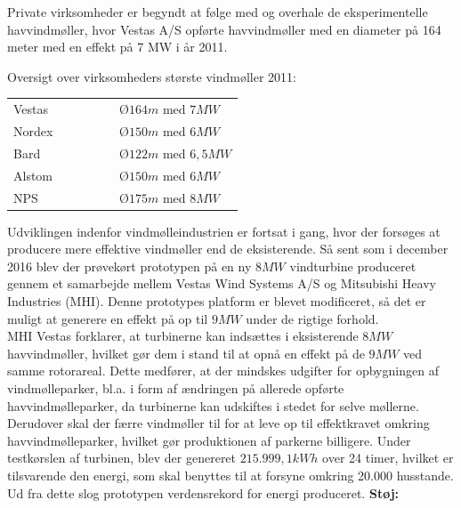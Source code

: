Private virksomheder er begyndt at følge med og overhale de eksperimentelle havvindmøller, hvor Vestas A/S opførte havvindmøller med en diameter på 164 meter med en effekt på 7 MW i år 2011.

Oversigt over virksomheders største vindmøller 2011: %
\begin{table}[H]
\centering
\begin{tabular}{l|l}
Vestas \ \ \ \ & \ \ \ \ $Ø164 m$ med $7 MW$ \\
Nordex \ \ \ \ & \ \ \ \ $Ø150 m$ med $6 MW$ \\
Bard \ \ \ \ & \ \ \ \ $Ø122 m$ med $6,5 MW$ \\
Alstom \ \ \ \ & \ \ \ \ $Ø150 m$ med $6 MW$ \\
NPS \ \ \ \ & \ \ \ \ $Ø175 m$ med $8 MW$
\end{tabular}
\end{table}
Udviklingen indenfor vindmølleindustrien er fortsat i gang, hvor der forsøges at producere mere effektive vindmøller end de eksisterende. Så sent som i december 2016 blev der prøvekørt prototypen på en ny $8 MW$ vindturbine produceret gennem et samarbejde mellem Vestas Wind Systems A/S og Mitsubishi Heavy Industries (MHI). Denne prototypes platform er blevet modificeret, så det er muligt at generere en effekt på op til $9 MW$ under de rigtige forhold. \\
MHI Vestas forklarer, at turbinerne kan indsættes i eksisterende $8 MW$ havvindmøller, hvilket gør dem i stand til at opnå en effekt på de $9 MW$ ved samme rotorareal. Dette medfører, at der mindskes udgifter for opbygningen af vindmølleparker, bl.a. i form af ændringen på allerede opførte havvindmølleparker, da turbinerne kan udskiftes i stedet for selve møllerne. Derudover skal der færre vindmøller til for at leve op til effektkravet omkring havvindmølleparker, hvilket gør produktionen af parkerne billigere. %
Under testkørslen af turbinen, blev der genereret $215.999,1 kWh$ over 24 timer, hvilket er tilsvarende den energi, som skal benyttes til at forsyne omkring 20.000 husstande. Ud fra dette slog prototypen verdensrekord for energi produceret. %
\newpage
\textbf{Støj:} \\
